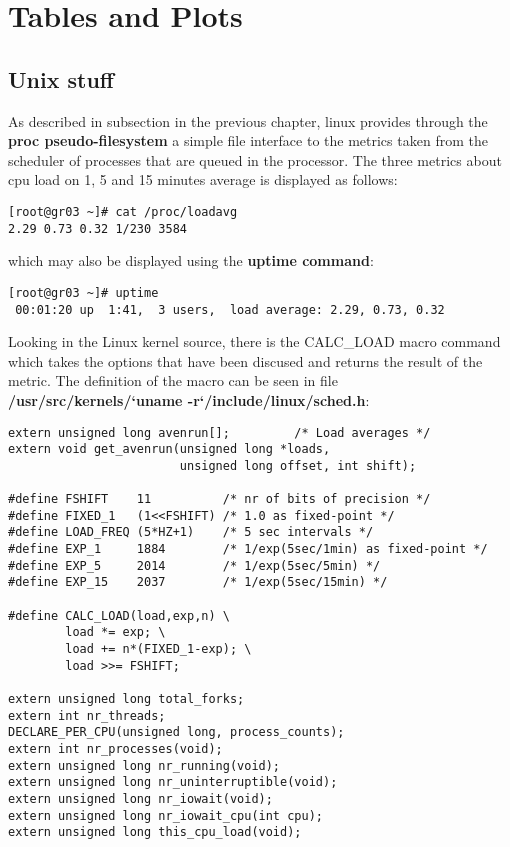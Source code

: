 \section{Tables and Plots}
\subsection{Unix stuff}

As described in subsection  in the previous chapter, linux provides through the {\bf proc pseudo-filesystem} a simple file interface to the metrics taken from the scheduler of processes that are queued in the processor. The three metrics about cpu load on 1, 5 and 15 minutes average is displayed as follows:

\begin{verbatim}
[root@gr03 ~]# cat /proc/loadavg 
2.29 0.73 0.32 1/230 3584
\end{verbatim}

which may also be displayed using the {\bf uptime command}:

\begin{verbatim}
[root@gr03 ~]# uptime
 00:01:20 up  1:41,  3 users,  load average: 2.29, 0.73, 0.32
\end{verbatim}

Looking in the Linux kernel source, there is the CALC\_LOAD macro command which takes the options that have been discused and returns the result of the metric. The definition of the macro can be seen in file {\bf /usr/src/kernels/`uname -r`/include/linux/sched.h}:

\begin{lstlisting}[caption=Linux kernel CALC\_LOAD macro]
extern unsigned long avenrun[];         /* Load averages */
extern void get_avenrun(unsigned long *loads, 
                        unsigned long offset, int shift);

#define FSHIFT    11          /* nr of bits of precision */
#define FIXED_1   (1<<FSHIFT) /* 1.0 as fixed-point */
#define LOAD_FREQ (5*HZ+1)    /* 5 sec intervals */
#define EXP_1     1884        /* 1/exp(5sec/1min) as fixed-point */
#define EXP_5     2014        /* 1/exp(5sec/5min) */
#define EXP_15    2037        /* 1/exp(5sec/15min) */

#define CALC_LOAD(load,exp,n) \
        load *= exp; \
        load += n*(FIXED_1-exp); \
        load >>= FSHIFT;

extern unsigned long total_forks;
extern int nr_threads;
DECLARE_PER_CPU(unsigned long, process_counts);
extern int nr_processes(void);
extern unsigned long nr_running(void);
extern unsigned long nr_uninterruptible(void);
extern unsigned long nr_iowait(void);
extern unsigned long nr_iowait_cpu(int cpu);
extern unsigned long this_cpu_load(void);
\end{lstlisting}


